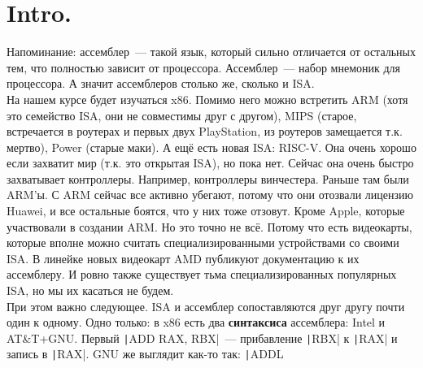 \documentclass{article}
\begin{document}
    \tableofcontents
    \section{Intro.}
    Напоминание: ассемблер~--- такой язык, который сильно отличается от остальных тем, что полностью зависит от процессора. Ассемблер~--- набор мнемоник для процессора. А значит ассемблеров столько же, сколько и ISA.\\
    На нашем курсе будет изучаться x86. Помимо него можно встретить ARM (хотя это семейство ISA, они не совместимы друг с другом), MIPS (старое, встречается в роутерах и первых двух PlayStation, из роутеров замещается т.к. мертво), Power (старые маки). А ещё есть новая ISA: RISC-V. Она очень хорошо если захватит мир (т.к. это открытая ISA), но пока нет. Сейчас она очень быстро захватывает контроллеры. Например, контроллеры винчестера. Раньше там были ARM'ы. С ARM сейчас все активно убегают, потому что они отозвали лицензию Huawei, и все остальные боятся, что у них тоже отзовут. Кроме Apple, которые участвовали в создании ARM. Но это точно не всё. Потому что есть видеокарты, которые вполне можно считать специализированными устройствами со своими ISA. В линейке новых видеокарт AMD публикуют документацию к их ассемблеру. И ровно также существует тьма специализированных популярных ISA, но мы их касаться не будем.\\
    При этом важно следующее. ISA и ассемблер сопоставляются друг другу почти один к одному. Одно только: в x86 есть два \textbf{синтаксиса} ассемблера: Intel и AT\&T+GNU. Первый \texttt|ADD RAX, RBX|~--- прибавление \texttt|RBX| к \texttt|RAX| и запись в \texttt|RAX|. GNU же выглядит как-то так: \texttt|ADDL %
\end{document}
